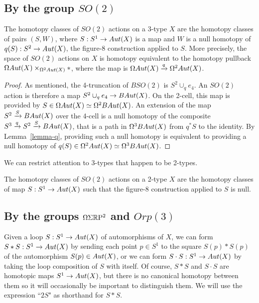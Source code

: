 \documentclass{amsart}
\begin{document}

\subsection{By the group $SO(2)$}

\begin{prop} \label{prop-so2action}
The homotopy classes of $SO(2)$ actions on a 3-type $X$ are the homotopy classes of pairs $(S,W)$, where $S: S^1 \rightarrow Aut(X)$ is a map and $W$ is a null homotopy of $q(S): S^2 \rightarrow Aut(X)$, the figure-8 construction applied to $S$.  More precisely, the space of $SO(2)$ actions on $X$ is homotopy equivalent to the homotopy pullback $\Omega Aut(X) \times_{\Omega^2 Aut(X)} \ast$, where the map is $\Omega Aut(X) \xrightarrow{q} \Omega^2 Aut(X)$.
\end{prop}
\begin{proof}
As mentioned, the 4-truncation of $BSO(2)$ is $S^2 \cup_q e_4$.  An $SO(2)$ action is therefore a map $S^2 \cup_q e_4 \rightarrow BAut(X)$.  On the 2-cell, this map is provided by $S \in \Omega Aut(X) \simeq \Omega^2 BAut(X)$.  An extension of the map $S^2 \xrightarrow{S} BAut(X)$ over the 4-cell is a null homotopy of the composite $S^3 \xrightarrow{q} S^2 \xrightarrow{S} BAut(X)$, that is a path in $\Omega^3 BAut(X)$ from $q^\ast S$ to the identity.  By Lemma~\ref{lemma-q}, providing such a null homotopy is equivalent to providing a null homotopy of $q(S) \in \Omega^2Aut(X) \simeq \Omega^3 BAut(X)$.
\end{proof}

We can restrict attention to 3-types that happen to be 2-types.
\begin{corollary}
The homotopy classes of $SO(2)$ actions on a 2-type $X$ are the homotopy classes of map $S: S^1 \rightarrow Aut(X)$ such that the figure-8 construction applied to $S$ is null.
\end{corollary}

\subsection{By the groups $\Omega \Sigma \mathbb R \mathrm{P}^2$ and $Orp(3)$}

Given a loop $S: S^1 \rightarrow Aut(X)$ of automorphisms of $X$, we can form $S \ast S : S^1 \rightarrow Aut(X)$ by sending each point $p \in S^1$ to the square $S(p) \ast S(p)$ of the automorphism $S(p) \in Aut(X)$, or we can form $S \cdot S : S^1 \rightarrow Aut(X)$ by taking the loop composition of $S$ with itself.  Of course, $S \ast S$ and $S \cdot S$ are homotopic maps $S^1 \rightarrow Aut(X)$, but there is no canonical homotopy between them so it will occasionally be important to distinguish them.  We will use the expression ``$2S$" as shorthand for $S \ast S$.
\end{document}
